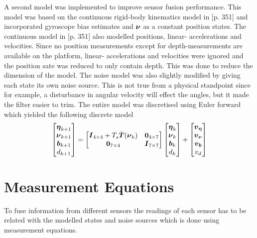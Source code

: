 A second model was implemented to improve sensor fusion performance. This model was based on the continuous rigid-body kinematics model in \citet{sensorfusion}[p. 351] and incorporated gyroscope bias estimates and $\boldsymbol{\nu}$ as a constant position states. The continuous model in \citet{sensorfusion}[p. 351] also modelled positions, linear- accelerations and velocities. Since no position measurements except for depth-measurements are available on the \abbrROV platform, linear- accelerations and velocities were ignored and the position sate was reduced to only contain depth. This was done to reduce the dimension of the model. The noise model was also slightly modified by giving each state its own noise source. This is not true from a physical standpoint since for example, a disturbance in angular velocity will effect the angles, but it made the filter easier to trim. The entire model was discretised using Euler forward which yielded the following discrete model
\begin{equation}\label{eq:expanded_model}
\begin{bmatrix}
\boldsymbol{\eta}_{k+1}\\
\boldsymbol{\nu}_{k+1}\\
\boldsymbol{b}_{k+1}\\
d_{k+1}
\end{bmatrix}=
\begin{bmatrix}
\boldsymbol{I}_{4\times4} + T_s \bar{\boldsymbol{T}}(\boldsymbol{\nu}_{k})& \boldsymbol{0}_{4\times7}\\
\boldsymbol{0}_{7\times4} & \boldsymbol{I}_{7\times7}\\
\end{bmatrix}
\begin{bmatrix}
\boldsymbol{\eta}_{k}\\
\boldsymbol{\nu}_{k}\\
\boldsymbol{b}_{k}\\
d_{k}
\end{bmatrix}
+\begin{bmatrix}
  \boldsymbol{v}_{\boldsymbol{\eta}}\\
  \boldsymbol{v}_{\boldsymbol{\nu}}\\
  \boldsymbol{v}_{\boldsymbol{b}}\\
  v_d 
\end{bmatrix}
\end{equation}

\section{Measurement Equations}\label{sec:Meas}
To fuse information from different sensors the readings of each sensor has to be related with the modelled states and noise sources which is done using measurement equations.


